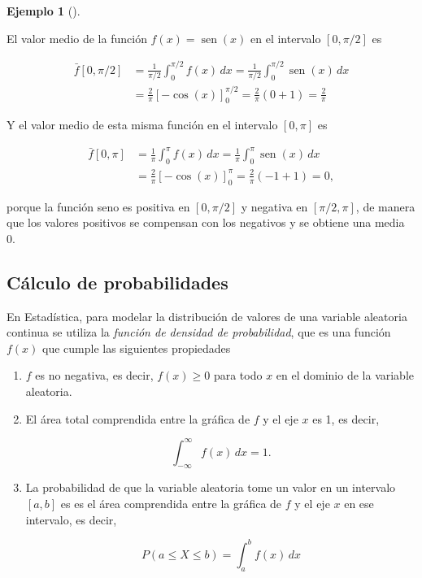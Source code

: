 \documentclass[
  a4paper,
]{scrreport}
\theoremstyle{definition}
\newtheorem{example}{Ejemplo}[chapter]
\theoremstyle{plain}
\theoremstyle{definition}
\theoremstyle{definition}
\theoremstyle{plain}
\theoremstyle{plain}
\theoremstyle{remark}
\begin{document}
\begin{example}[]\protect\hypertarget{exm-valor-medio}{}\label{exm-valor-medio}

El valor medio de la función \(f(x)=\operatorname{sen}(x)\) en el
intervalo \([0,\pi/2]\) es

\begin{align*}
\bar f[0,\pi/2]
&= \frac{1}{\pi/2} \int_0^{\pi/2} f(x)\, dx 
= \frac{1}{\pi/2} \int_0^{\pi/2} \operatorname{sen}(x)\, dx \\
&= \frac{2}{\pi}[-\cos(x)]_0^{\pi/2}
= \frac{2}{\pi}(0+1)
= \frac{2}{\pi}
\end{align*}

Y el valor medio de esta misma función en el intervalo \([0,\pi]\) es

\begin{align*}
\bar f[0,\pi] 
&= \frac{1}{\pi} \int_0^{\pi} f(x)\, dx 
= \frac{1}{\pi} \int_0^{\pi} \operatorname{sen}(x)\, dx \\
&= \frac{2}{\pi}[-\cos(x)]_0^{\pi}
= \frac{2}{\pi}(-1+1)
= 0,
\end{align*}

porque la función seno es positiva en \([0,\pi/2]\) y negativa en
\([\pi/2, \pi]\), de manera que los valores positivos se compensan con
los negativos y se obtiene una media 0.

\end{example}

\subsection{Cálculo de
probabilidades}\label{cuxe1lculo-de-probabilidades}

En Estadística, para modelar la distribución de valores de una variable
aleatoria continua se utiliza la \emph{función de densidad de
probabilidad}, que es una función \(f(x)\) que cumple las siguientes
propiedades

\begin{enumerate}
\def\labelenumi{\arabic{enumi}.}
\item
  \(f\) es no negativa, es decir, \(f(x)\geq 0\) para todo \(x\) en el
  dominio de la variable aleatoria.
\item
  El área total comprendida entre la gráfica de \(f\) y el eje \(x\) es
  1, es decir,

  \[
  \int_{-\infty}^{\infty} f(x)\,dx = 1.
  \]
\item
  La probabilidad de que la variable aleatoria tome un valor en un
  intervalo \([a,b]\) es es el área comprendida entre la gráfica de
  \(f\) y el eje \(x\) en ese intervalo, es decir,

  \[
  P(a\leq X\leq b) = \int_a^b f(x)\,dx
  \]
\end{enumerate}
\end{document}
